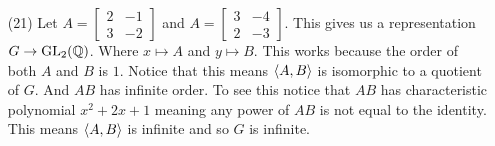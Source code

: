 \documentclass[12pt]{amsart}
\begin{document}
\begin{itemize}
   \item[(21)] Let $A=\begin{bmatrix}2 &-1\\3&-2\end{bmatrix}$ and
    $A=\begin{bmatrix}3 &-4\\2&-3\end{bmatrix}$. This gives us a representation $G\rightarrow \text{GL}_2(\mathbb{Q})$.
    Where $x\mapsto A$ and $y\mapsto B$. This works because the order of both $A$ and $B$ is $1$.
    Notice that this means $\left\langle A,B \right\rangle$ is isomorphic to a quotient of $G$. And $AB$ has infinite order.
    To see this notice that $AB$ has characteristic polynomial $x^2+2x+1$ meaning any power of $AB$ is not 
    equal to the identity. This means $\left\langle A,B \right\rangle$ is infinite and so $G$ is infinite.

\end{itemize}
\end{document}
